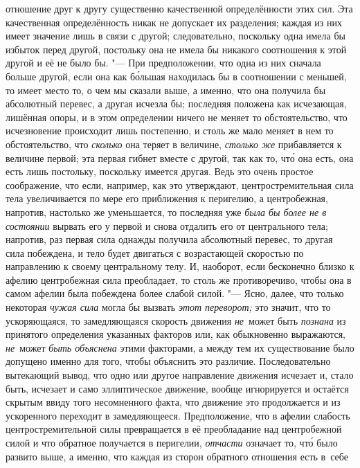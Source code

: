 отношение друг к другу существенно качественной определённости этих сил. Эта
качественная определённость никак не допускает их разделения; каждая из них
имеет значение лишь в связи с другой; следовательно, поскольку одна имела бы
избыток перед другой, постольку она не имела бы никакого соотношения к этой
другой и её не было бы. "--- При предположении, что одна из них сначала больше
другой, если она как б\'{о}льшая находилась бы в соотношении с меньшей, то
имеет место то, о чем мы сказали выше, а именно, что она получила бы абсолютный
перевес, а другая исчезла бы; последняя положена как исчезающая, лишённая
опоры, и в этом определении ничего не меняет то обстоятельство, что
исчезновение происходит лишь постепенно, и столь же мало меняет в нем то
обстоятельство, что {\em сколько} она теряет в величине, {\em столько же}
прибавляется к величине первой; эта первая гибнет вместе с другой, так как то,
чт\'{о} она есть, она есть лишь постольку, поскольку имеется другая. Ведь это
очень простое соображение, что если, например, как это утверждают,
центростремительная сила тела увеличивается по мере его приближения к
перигелию, а центробежная, напротив, настолько же уменьшается, то последняя уже
{\em была бы более не в состоянии} вырвать его у первой и снова отдалить его от
центрального тела; напротив, раз первая сила однажды получила абсолютный
перевес, то другая сила побеждена, и тело будет двигаться с возрастающей
скоростью по направлению к своему центральному телу. И, наоборот, если
бесконечно близко к афелию центробежная сила преобладает, то столь же
противоречиво, чтобы она в самом афелии была побеждена более слабой силой. "---
Ясно, далее, что только некоторая {\em чужая сила} могла бы вызвать
{\em этот переворот;} это значит, что то ускоряющаяся, то замедляющаяся
скорость движения {\em не}~может быть {\em познана} из принятого определения
указанных факторов или, как обыкновенно выражаются, {\em не}~может
{\em быть объяснена} этими факторами, а между тем их существование было
допущено именно для того, чтобы объяснить это различие. Последовательно
вытекающий вывод, что одно или другое направление движения исчезает и, стало
быть, исчезает и само эллиптическое движение, вообще игнорируется и остаётся
скрытым ввиду того несомненного факта, что движение это продолжается и из
ускоренного переходит в замедляющееся. Предположение, что в афелии слабость
центростремительной силы превращается в её преобладание над центробежной силой
и что обратное получается в перигелии, {\em отчасти} означает то, чт\'{о} было
развито выше, а именно, что каждая из сторон обратного отношения есть в~себе
